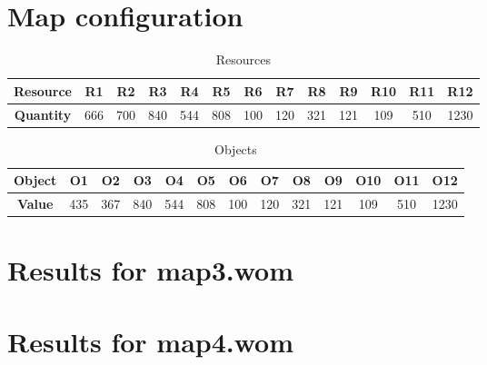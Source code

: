\documentclass[a4paper,10pt]{article}
\begin{document}
\section{Map configuration}
\label{sec:mapconfig2}

\begin{table}[htb]
\caption{Resources}
\centering
\begin{tabular}{|c||c|c|c|c|c|c|c|c|c|c|c|c|}
\hline
\textbf{Resource} & R1 & R2 & R3 & R4 & R5 & R6 & R7 & R8 & R9 & R10 & R11 & R12\\
\hline
\textbf{Quantity} & 666 & 700 & 840 & 544 & 808 & 100 & 120 & 321 & 121 & 109 & 510 & 1230\\
\hline
\end{tabular}
\label{table:res_map2.wom}
\end{table}


\begin{table}[htb]
\caption{Objects}
\centering
\begin{tabular}{|c||c|c|c|c|c|c|c|c|c|c|c|c|}
\hline
\textbf{Object} & O1 & O2 & O3 & O4 & O5 & O6 & O7 & O8 & O9 & O10 & O11 & O12\\
\hline
\textbf{Value} & 435 & 367 & 840 & 544 & 808 & 100 & 120 & 321 & 121 & 109 & 510 & 1230\\
\hline
\end{tabular}
\label{table: obj_map2.wom}
\end{table}

\newpage
\section{Results for map3.wom}
\label{sec:map3.wom}
\newpage
\section{Results for map4.wom}
\label{sec:map4.wom}
\end{document}
